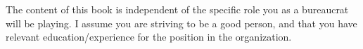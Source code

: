
The content of this book is independent of the specific role you as a bureaucrat will be playing. I assume you are striving to be a good person, and that you have relevant education/experience for the position in the organization.

